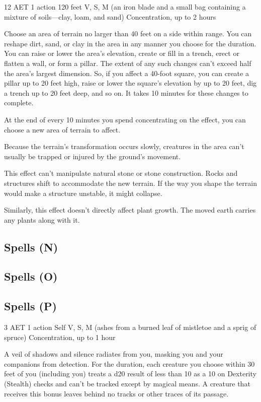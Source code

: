 \label{spell:move-earth}
{12 AET}
{1 action}
{120 feet}
{V, S, M (an iron blade and a small bag containing a mixture of soils—clay, loam, and sand)}
{Concentration, up to 2 hours}

Choose an area of terrain no larger than 40 feet on a side within range. You can reshape dirt, sand, or clay in the area in any manner you choose for the duration. You can raise or lower the area's elevation, create or fill in a trench, erect or flatten a wall, or form a pillar. The extent of any such changes can't exceed half the area's largest dimension. So, if you affect a 40-foot square, you can create a pillar up to 20 feet high, raise or lower the square's elevation by up to 20 feet, dig a trench up to 20 feet deep, and so on. It takes 10 minutes for these changes to complete.

At the end of every 10 minutes you spend concentrating on the effect, you can choose a new area of terrain to affect.

Because the terrain's transformation occurs slowly, creatures in the area can't usually be trapped or injured by the ground's movement.

This effect can't manipulate natural stone or stone construction. Rocks and structures shift to accommodate the new terrain. If the way you shape the terrain would make a structure unstable, it might collapse.

Similarly, this effect doesn't directly affect plant growth. The moved earth carries any plants along with it.

\subsection{Spells (N)}

\subsection{Spells (O)}

\subsection{Spells (P)}

\label{spell:pass-without-trace}
{3 AET}
{1 action}
{Self}
{V, S, M (ashes from a burned leaf of mistletoe and a sprig of spruce)}
{Concentration, up to 1 hour}

A veil of shadows and silence radiates from you, masking you and your companions from detection. For the duration, each creature you choose within 30 feet of you (including you) treats a d20 result of less than 10 as a 10 on Dexterity (Stealth) checks and can't be tracked except by magical means. A creature that receives this bonus leaves behind no tracks or other traces of its passage.

